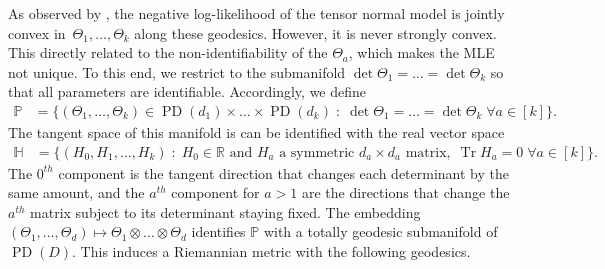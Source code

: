 \documentclass[aos]{imsart}
\theoremstyle{definition}
\numberwithin{equation}{section}
\DeclareMathOperator{\tr}{Tr}
\DeclareMathOperator{\PD}{PD}
\newcommand{\R}{{\mathbb{R}}}
\renewcommand{\P}{{\mathbb{P}}}
\renewcommand{\H}{{\mathbb{H}}}
\newcommand{\ot}{\otimes}
\begin{document}
As observed by \cite{wiesel2012geodesic}, the negative log-likelihood of the tensor normal model is jointly convex in~$\Theta_1,\dots,\Theta_k$ along these geodesics.
However, it is never strongly convex. This directly related to the non-identifiability of the $\Theta_a$, which makes the MLE not unique. To this end, we restrict to the submanifold $\det\Theta_1= \dots = \det \Theta_k$ so that all parameters are identifiable.
Accordingly, we define
\begin{align*}
  \P &= \{ (\Theta_1,\dots,\Theta_k) \in \PD(d_1) \times \dots \times \PD(d_k) \;:\; \det \Theta_1 = \dots = \det \Theta_k \; \forall a \in [k] \}.
 \end{align*}
 The tangent space of this manifold is can be identified with the real vector space
\begin{align*}
  \H &= \{ (H_0, H_1,\dots,H_k) \;:\; H_0 \in \R \text{ and }H_a \text{ a symmetric $d_a \times d_a$ matrix}, \; \tr H_a = 0\; \forall a \in [k]  \}.
\end{align*}
The $0^{th}$ component is the tangent direction that changes each determinant by the same amount, and the $a^{th}$ component for $a > 1$ are the directions that change the $a^{th}$ matrix subject to its determinant staying fixed. The embedding $(\Theta_1,\dots,\Theta_d) \mapsto  \Theta_1 \ot \dots \ot \Theta_d$ identifies $\P$ with a totally geodesic submanifold of $\PD(D)$. This induces a Riemannian metric with the following geodesics.
\end{document}
